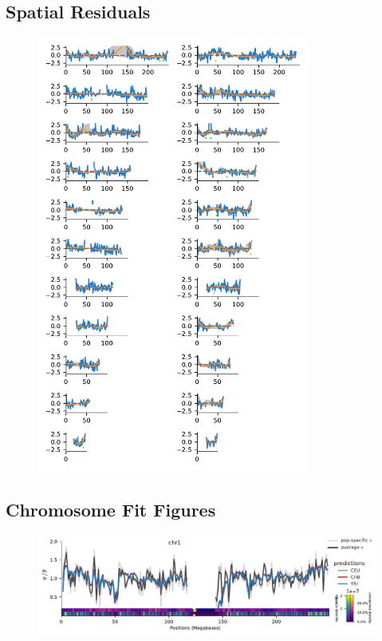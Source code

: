 \documentclass[11pt]{article}
\begin{document}
\subsection{Spatial Residuals}
\label{supp:spatial-residuals}

\begin{figure}[!htb]
  \centering
  \includegraphics[width=0.8\textwidth]{figures/supplementary/spatial_residual.pdf}
  \label{suppfig:spatial-residuals}
\end{figure}


\clearpage

\subsection{Chromosome Fit Figures}
\label{supp:chrom-fit}

\begin{figure}[!htb]
  \centering
  \includegraphics[width=\textwidth]{figures/supplementary/pred_plot_chr1.pdf}
  \label{suppfig:fit-chr1}
\end{figure}
\end{document}
